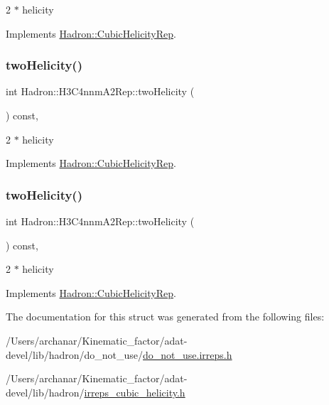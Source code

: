 2 $\ast$ helicity 

Implements \mbox{\hyperlink{structHadron_1_1CubicHelicityRep_af507aa56fc2747eacc8cb6c96db31ecc}{Hadron\+::\+Cubic\+Helicity\+Rep}}.

\mbox{\label{structHadron_1_1H3C4nnmA2Rep_aeeec45fb753cc4ac9b6de1d24a868ab9}} 
\subsubsection{\texorpdfstring{twoHelicity()}{twoHelicity()}\hspace{0.1cm}{\footnotesize\ttfamily [2/3]}}
{\footnotesize\ttfamily int Hadron\+::\+H3\+C4nnm\+A2\+Rep\+::two\+Helicity (\begin{DoxyParamCaption}{ }\end{DoxyParamCaption}) const\hspace{0.3cm}{\ttfamily [inline]}, {\ttfamily [virtual]}}

2 $\ast$ helicity 

Implements \mbox{\hyperlink{structHadron_1_1CubicHelicityRep_af507aa56fc2747eacc8cb6c96db31ecc}{Hadron\+::\+Cubic\+Helicity\+Rep}}.

\mbox{\label{structHadron_1_1H3C4nnmA2Rep_aeeec45fb753cc4ac9b6de1d24a868ab9}} 
\subsubsection{\texorpdfstring{twoHelicity()}{twoHelicity()}\hspace{0.1cm}{\footnotesize\ttfamily [3/3]}}
{\footnotesize\ttfamily int Hadron\+::\+H3\+C4nnm\+A2\+Rep\+::two\+Helicity (\begin{DoxyParamCaption}{ }\end{DoxyParamCaption}) const\hspace{0.3cm}{\ttfamily [inline]}, {\ttfamily [virtual]}}

2 $\ast$ helicity 

Implements \mbox{\hyperlink{structHadron_1_1CubicHelicityRep_af507aa56fc2747eacc8cb6c96db31ecc}{Hadron\+::\+Cubic\+Helicity\+Rep}}.



The documentation for this struct was generated from the following files\+:\begin{DoxyCompactItemize}
\item 
/\+Users/archanar/\+Kinematic\+\_\+factor/adat-\/devel/lib/hadron/do\+\_\+not\+\_\+use/\mbox{\hyperlink{adat-devel_2lib_2hadron_2do__not__use_2do__not__use_8irreps_8h}{do\+\_\+not\+\_\+use.\+irreps.\+h}}\item 
/\+Users/archanar/\+Kinematic\+\_\+factor/adat-\/devel/lib/hadron/\mbox{\hyperlink{adat-devel_2lib_2hadron_2irreps__cubic__helicity_8h}{irreps\+\_\+cubic\+\_\+helicity.\+h}}\end{DoxyCompactItemize}
